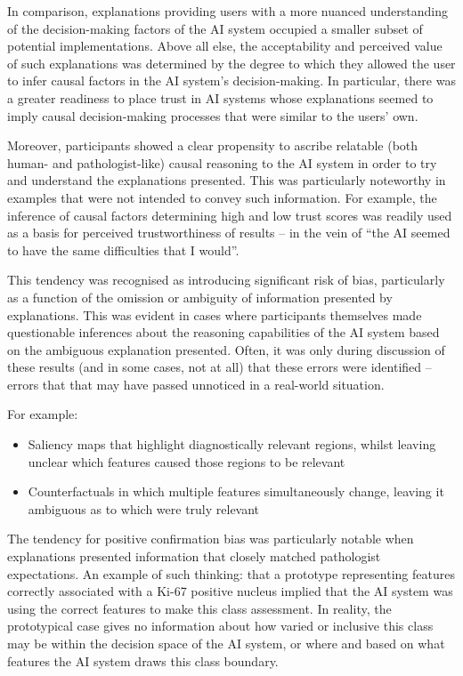 \documentclass[final,5p,times,twocolumn,hyphens]{elsarticle}
\begin{document}
In comparison, explanations providing users with a more nuanced understanding of the decision-making factors of the AI system occupied a smaller subset of potential implementations. Above all else, the acceptability and perceived value of such explanations was determined by the degree to which they allowed the user to infer causal factors in the AI system's decision-making. In particular, there was a greater readiness to place trust in AI systems whose explanations seemed to imply causal decision-making processes that were similar to the users' own.

Moreover, participants showed a clear propensity to ascribe relatable (both human- and pathologist-like) causal reasoning to the AI system in order to try and understand the explanations presented. This was particularly noteworthy in examples that were not intended to convey such information. For example, the inference of causal factors determining high and low trust scores was readily used as a basis for perceived trustworthiness of results -- in the vein of ``the AI seemed to have the same difficulties that I would''.

This tendency was recognised as introducing significant risk of bias, particularly as a function of the omission or ambiguity of information presented by explanations. This was evident in cases where participants themselves made questionable inferences about the reasoning capabilities of the AI system based on the ambiguous explanation presented. Often, it was only during discussion of these results (and in some cases, not at all) that these errors were identified -- errors that that may have passed unnoticed in a real-world situation. 

For example:
\begin{itemize}
    \item Saliency maps that highlight diagnostically relevant regions, whilst leaving unclear which features caused those regions to be relevant
    \item Counterfactuals in which multiple features simultaneously change, leaving it ambiguous as to which were truly relevant
\end{itemize}

The tendency for positive confirmation bias was particularly notable when explanations presented information that closely matched pathologist expectations. An example of such thinking: that a prototype representing features correctly associated with a Ki-67 positive nucleus implied that the AI system was using the correct features to make this class assessment. In reality, the prototypical case gives no information about how varied or inclusive this class may be within the decision space of the AI system, or where and based on what features the AI system draws this class boundary.
\end{document}
